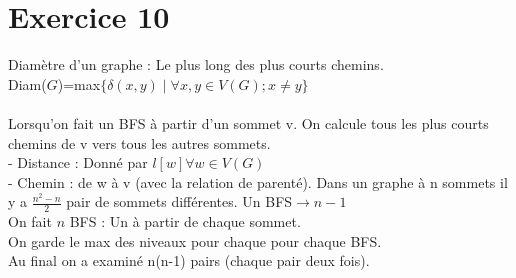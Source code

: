 \documentclass{article}
\begin{document}
\section*{Exercice 10}
Diamètre d'un graphe : Le plus long des plus courts chemins. \\
Diam($G$)=max$\{\delta(x,y) \mid \forall x,y \in V(G); x \neq y\}$ 
\\
\\
Lorsqu'on fait un BFS à partir d'un sommet v. On calcule tous les plus courts chemins de v vers tous les autres sommets. \\
- Distance : Donné par $l[w] \forall w \in V(G)$ \\
- Chemin : de w à v (avec la relation de parenté). 
Dans un graphe à n sommets il y a $\frac{n^2-n}{2}$ pair de sommets différentes.
Un BFS$\rightarrow n-1$ \\
On fait $n$ BFS : Un à partir de chaque sommet. \\
On garde le max des niveaux pour chaque pour chaque BFS. \\
Au final on a examiné n(n-1) pairs (chaque pair deux fois).
\end{document}
